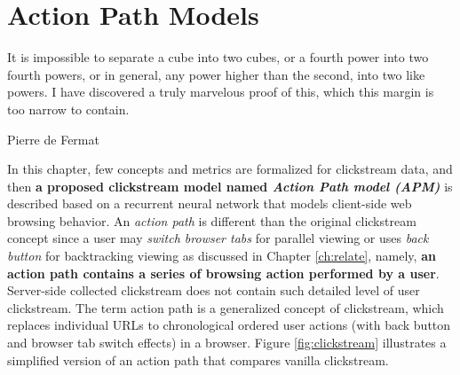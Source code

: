 \section{Action Path Models}
\label{ch:model}

\epigraph{It is impossible to separate a cube into two cubes, or a fourth power into 
two fourth powers, or in general, any power higher than the second, into two like powers. 
I have discovered a truly marvelous proof of this, which this margin is too narrow 
to contain.}{Pierre de Fermat}

In this chapter, few concepts and metrics are formalized for clickstream data,
and then \textbf{a proposed clickstream model named \emph{Action Path model (APM)}} is described
based on a recurrent neural network that models client-side web browsing behavior. 
An \emph{action path} is different than the original clickstream concept since 
a user may \emph{switch browser tabs} for parallel viewing \cite{huang2010parallel} 
or uses \emph{back button} 
for backtracking viewing \cite{huang2012no} as discussed in Chapter \ref{ch:relate}, 
namely, \textbf{an action path contains a series of browsing action performed by a user}.
Server-side collected clickstream does not contain such detailed level of user clickstream.
The term action path is a generalized concept of clickstream, 
which replaces individual URLs to chronological ordered user actions 
(with back button and browser tab switch effects) in a browser.
Figure \ref{fig:clickstream} illustrates a simplified version of an action path 
that compares vanilla clickstream.

